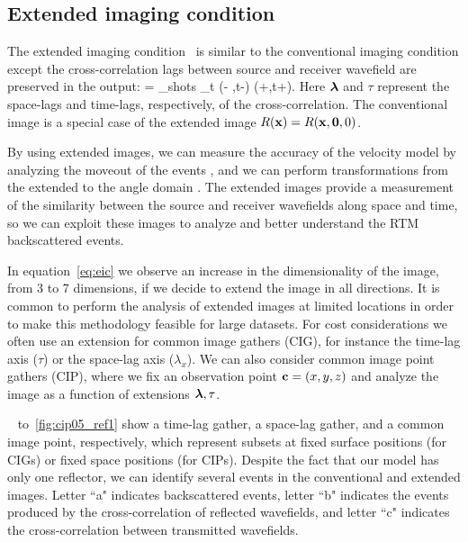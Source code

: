 



\subsection{Extended imaging condition}

The extended imaging condition~\citep{rickett:883,sava:S209,GPR:GPR888} is similar to the conventional imaging condition
 except the cross-correlation lags between source and receiver wavefield are preserved in the output:
\beq
\Re= \sum_{shots} \sum_{t} \US(\xx - \hh,t-\tau) \UR(\xx+\hh,t+\tau).
\label{eq:eic}
\eeq
Here ${\boldsymbol{\lambda}}$ and $\tau$ represent the space-lags and time-lags, respectively, of the cross-correlation.
%
The conventional image is a special case of the extended image $R({\bf x})=R({\bf x},{\bf 0},0)$.

By using extended images, we can measure the accuracy of the velocity model by analyzing the moveout of the events
 \citep{yang:S151}, and we can perform transformations from the extended to the angle domain 
\citep{sava:1065,sava:S209,sava:S131}. The extended images provide a measurement of the similarity between the source
 and receiver wavefields along space and time, so we can exploit these images to analyze and better understand the RTM backscattered events.

In equation~\ref{eq:eic} we observe an increase in the dimensionality of the image, from 3 to 7 dimensions,
if we decide to extend the image in all directions. It is common to perform the analysis 
of extended images at limited locations in order to make this methodology feasible for large datasets. 
For cost considerations we often use an extension for common image gathers (CIG), for instance
 the time-lag axis ($\tau$) or the space-lag axis ($\lambda_x$). We can also consider common image point gathers (CIP), where we 
fix an observation point ${\bf c}=(x,y,z)$ and analyze the image as a function of extensions ${\boldsymbol{\lambda}},\tau$. 

~ to~\ref{fig:cip05_ref1} show a time-lag gather, a space-lag gather,
 and a common image point, respectively, which represent subsets at fixed surface positions (for CIGs) or fixed space positions 
(for CIPs). Despite the fact that our model has only one reflector, we can identify several events in the conventional and extended images. 
Letter ``a" indicates backscattered events, letter ``b" indicates the events produced by the cross-correlation of 
reflected wavefields, and letter ``c" indicates the cross-correlation between transmitted wavefields.

